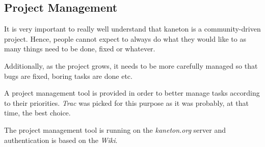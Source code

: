 %
%
%
%
%
%

%
%

\subsection{Project Management}
\label{section:project management}

It is very important to really well understand that kaneton is a
community-driven project. Hence, people cannot expect to always do what
they would like to as many things need to be done, fixed or whatever.

Additionally, as the project grows, it needs to be more carefully managed
so that bugs are fixed, boring tasks are done etc.

A project management tool is provided in order to better manage tasks
according to their priorities. \textit{Trac} was picked for this purpose
as it was probably, at that time, the best choice.

The project management tool is running on the \textit{kaneton.org} server
and authentication is based on the \textit{Wiki}.
